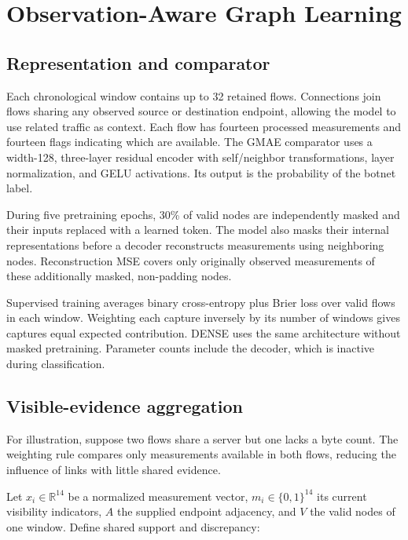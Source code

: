 \documentclass[11pt,letterpaper]{article}
\begin{document}
\section{Observation-Aware Graph Learning}

\subsection{Representation and comparator}

Each chronological window contains up to 32 retained flows. Connections join flows sharing any observed source or destination endpoint, allowing the model to use related traffic as context. Each flow has fourteen processed measurements and fourteen flags indicating which are available. The GMAE comparator uses a width-128, three-layer residual encoder with self/neighbor transformations, layer normalization, and GELU activations. Its output is the probability of the botnet label.\par

During five pretraining epochs, 30\% of valid nodes are independently masked and their inputs replaced with a learned token. The model also masks their internal representations before a decoder reconstructs measurements using neighboring nodes. Reconstruction MSE covers only originally observed measurements of these additionally masked, non-padding nodes.\par

Supervised training averages binary cross-entropy plus Brier loss over valid flows in each window. Weighting each capture inversely by its number of windows gives captures equal expected contribution. DENSE uses the same architecture without masked pretraining. Parameter counts include the decoder, which is inactive during classification.\par

\subsection{Visible-evidence aggregation}

For illustration, suppose two flows share a server but one lacks a byte count. The weighting rule compares only measurements available in both flows, reducing the influence of links with little shared evidence.\par

Let \(x_i\in\mathbb R^{14}\) be a normalized measurement vector, \(m_i\in\{0,1\}^{14}\) its current visibility indicators, \(A\) the supplied endpoint adjacency, and \(V\) the valid nodes of one window. Define shared support and discrepancy:\par
\end{document}
